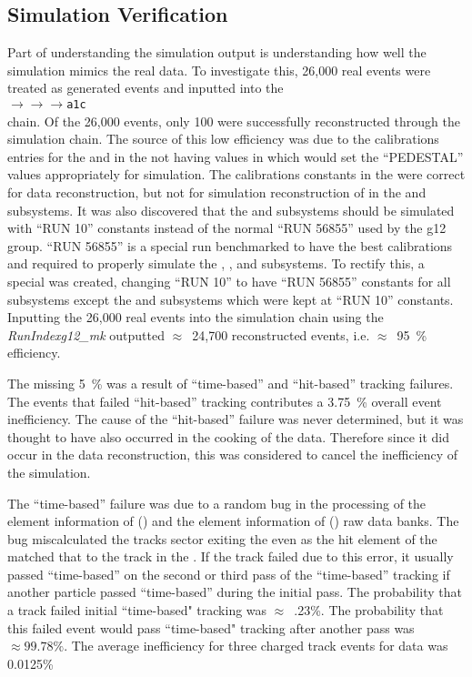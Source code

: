 \subsection{Simulation Verification}\label{sec:analysis.accept.verify}
Part of understanding the simulation output is understanding how well the simulation mimics the real data. To investigate this, 26,000 real \epemT events were treated as generated events and inputted into the \\ $\to$$\to$$\to$\texttt{a1c}
\\ chain. Of the 26,000 events, only 100 were successfully reconstructed through the simulation chain. The source of this low efficiency was due to the calibrations entries for the  and  in the  not having values in which would set the ``PEDESTAL'' values appropriately for simulation. The calibrations constants in the  were correct for data reconstruction, but not for simulation reconstruction of \epemT in the  and  subsystems. It was also discovered that the  and  subsystems should be simulated with ``RUN 10'' constants instead of the normal ``RUN 56855'' used by the g12 group. ``RUN 56855'' is a special run benchmarked to have the best calibrations and required to properly simulate the , , and  subsystems. To rectify this, a special  was created, changing ``RUN 10'' to have ``RUN 56855'' constants for all subsystems except the  and  subsystems which were kept at ``RUN 10'' constants. Inputting the 26,000 real \epemT events into the simulation chain using the  \emph{RunIndexg12\_mk} outputted $\approx$~24,700 \epemT reconstructed events, i.e. $\approx$~95~\% efficiency.

The missing 5~\% was a result of ``time-based'' and ``hit-based'' tracking failures. The events that failed ``hit-based'' tracking contributes a 3.75~\% overall event inefficiency. The cause of the ``hit-based'' failure was never determined, but it was thought to have also occurred in the cooking of the data. Therefore since it did occur in the data reconstruction, this was considered to cancel the inefficiency of the simulation.

The ``time-based'' failure was due to a random bug in the processing of the  element information of  () and the  element information of  () raw data banks. The bug miscalculated the tracks sector exiting the  even as the hit element of the  matched that to the track in the . If the track failed due to this error, it usually passed ``time-based'' on the second or third pass of the ``time-based'' tracking if another particle passed ``time-based'' during the initial pass. The probability that a track failed initial ``time-based" tracking was $\approx$~.23\%. The probability that this failed event would pass ``time-based" tracking after another pass was $\approx99.78\%$. The average inefficiency for three charged track events for data was 0.0125\%

